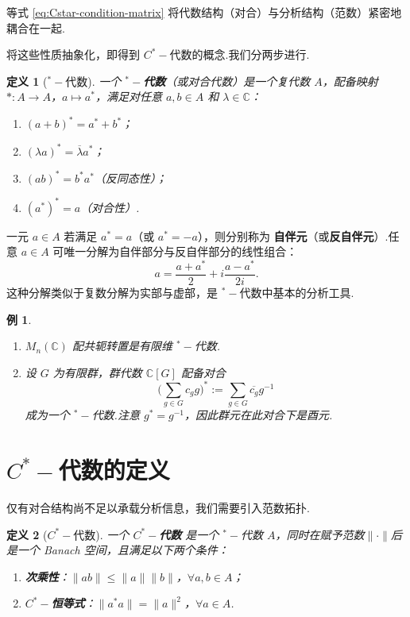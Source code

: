 \documentclass[math-font=lm, text-font=lm, math-style=TeX]{sjtureport}
\newtheorem{definition}{定义}[chapter]
\newtheorem{example}{例}[chapter]
\theoremstyle{plain}
\theoremstyle{plain}
\begin{document}
等式 \eqref{eq:Cstar-condition-matrix} 将代数结构（对合）与分析结构（范数）紧密地耦合在一起.

将这些性质抽象化，即得到 $C^*-\!$代数的概念.我们分两步进行.

\begin{definition}[${}^*-\!$代数]
    一个 \textbf{${}^*-\!$代数}（或对合代数）是一个复代数 $A$，配备映射 $*: A \to A$，$a \mapsto a^*$，满足对任意 $a,b \in A$ 和 $\lambda \in \mathbb{C}$：
    \begin{enumerate}[label=(\roman*)]
        \item $(a+b)^* = a^* + b^*$；
        \item $(\lambda a)^* = \overline{\lambda} a^*$；
        \item $(ab)^* = b^* a^*$（反同态性）；
        \item $(a^*)^* = a$（对合性）.
    \end{enumerate}
\end{definition}

一元 $a \in A$ 若满足 $a^* = a$（或 $a^* = -a$），则分别称为 \textbf{自伴元}（或\textbf{反自伴元}）.任意 $a \in A$ 可唯一分解为自伴部分与反自伴部分的线性组合：
\begin{equation}
    a = \frac{a + a^*}{2} + i \frac{a - a^*}{2i}.
\end{equation}
这种分解类似于复数分解为实部与虚部，是 ${}^*-\!$代数中基本的分析工具.

\begin{example}
    \begin{enumerate}
        \item $M_n(\mathbb{C})$ 配共轭转置是有限维 ${}^*-\!$代数.
        \item 设 $G$ 为有限群，群代数 $\mathbb{C}[G]$ 配备对合
        \begin{equation}
            \Big(\sum_{g \in G} c_g g\Big)^* := \sum_{g \in G} \overline{c_g} g^{-1}
        \end{equation}
        成为一个 ${}^*-\!$代数.注意 $g^* = g^{-1}$，因此群元在此对合下是酉元.
    \end{enumerate}
\end{example}

\section{$C^*-\!$代数的定义}

仅有对合结构尚不足以承载分析信息，我们需要引入范数拓扑.

\begin{definition}[$C^*-\!$代数]
    一个 \textbf{$C^*-\!$代数} 是一个 ${}^*-\!$代数 $A$，同时在赋予范数$\|\cdot\|$后是一个 Banach 空间，且满足以下两个条件：
    \begin{enumerate}[label=(\roman*)]
        \item \textbf{次乘性}：$\|ab\| \leq \|a\|\|b\|$，$\forall a,b \in A$；
        \item \textbf{$C^*-\!$恒等式}：$\|a^*a\| = \|a\|^2$，$\forall a \in A$.
    \end{enumerate}
\end{definition}
\end{document}
